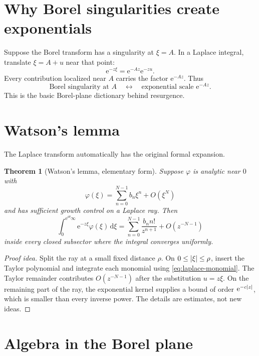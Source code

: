 \documentclass[11pt,oneside]{book}
\newtheorem{theorem}{Theorem}[chapter]
\theoremstyle{definition}
\theoremstyle{remark}
\newcommand{\e}{\mathrm{e}}
\newcommand{\dd}{\,\mathrm{d}}
\newcommand{\bigO}{O}
\DeclarePairedDelimiter{\abs}{\lvert}{\rvert}
\begin{document}
\section{Why Borel singularities create exponentials}

Suppose the Borel transform has a singularity at $\xi=A$. In a Laplace integral,
translate $\xi=A+u$ near that point:
\[
  \e^{-z\xi}=\e^{-Az}\e^{-zu}.
\]
Every contribution localized near $A$ carries the factor $\e^{-Az}$. Thus
\begin{equation}
  \boxed{\text{Borel singularity at }A
  \quad\longleftrightarrow\quad
  \text{exponential scale }\e^{-Az}.}
  \label{eq:borel-singularity-dictionary}
\end{equation}
This is the basic Borel-plane dictionary behind resurgence.

\section{Watson's lemma}

The Laplace transform automatically has the original formal expansion.

\begin{theorem}[Watson's lemma, elementary form]
Suppose $\varphi$ is analytic near $0$ with
\[
  \varphi(\xi)=\sum_{n=0}^{N-1}b_n\xi^n+\bigO(\xi^N)
\]
and has sufficient growth control on a Laplace ray. Then
\begin{equation}
  \int_0^{\e^{i\theta}\infty}\e^{-z\xi}\varphi(\xi)\dd\xi
  =\sum_{n=0}^{N-1}\frac{b_n n!}{z^{n+1}}
   +\bigO(z^{-N-1})
  \label{eq:watson-lemma}
\end{equation}
inside every closed subsector where the integral converges uniformly.
\end{theorem}

\begin{proof}[Proof idea]
Split the ray at a small fixed distance $\rho$. On $0\le\abs\xi\le\rho$,
insert the Taylor polynomial and integrate each monomial using
\eqref{eq:laplace-monomial}. The Taylor remainder contributes
$\bigO(z^{-N-1})$ after the substitution $u=z\xi$. On the remaining part of the
ray, the exponential kernel supplies a bound of order $\e^{-c\abs z}$, which is
smaller than every inverse power. The details are estimates, not new ideas.
\end{proof}

\section{Algebra in the Borel plane}
\end{document}
